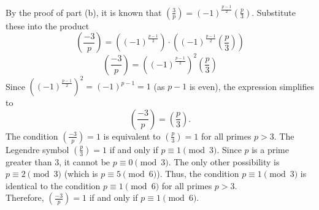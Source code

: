 \begin{enumerate}
\begin{enumerate}
\begin{subprove}
      By the proof of part (b), it is known that $\left(\frac{3}{p}\right) = (-1)^{\frac{p-1}{2}}\left(\frac{p}{3}\right)$.
      Substitute these into the product
      \[
      \left(\frac{-3}{p}\right) = \left( (-1)^{\frac{p-1}{2}} \right) \cdot \left( (-1)^{\frac{p-1}{2}}\left(\frac{p}{3}\right) \right)
      \]
      \[
      \left(\frac{-3}{p}\right) = \left( (-1)^{\frac{p-1}{2}} \right)^2 \left(\frac{p}{3}\right)
      \]
      Since $\left( (-1)^{\frac{p-1}{2}} \right)^2 = (-1)^{p-1} = 1$ (as $p-1$ is even), the expression simplifies to
      \[
      \left(\frac{-3}{p}\right) = \left(\frac{p}{3}\right).
      \]
      The condition $\left(\frac{-3}{p}\right) = 1$ is equivalent to $\left(\frac{p}{3}\right) = 1$ for all primes $p>3$.
      The Legendre symbol $\left(\frac{p}{3}\right) = 1$ if and only if $p \equiv 1 \pmod 3$.
      Since $p$ is a prime greater than $3$, it cannot be $p \equiv 0 \pmod 3$. The only other possibility is $p \equiv 2 \pmod 3$ (which is $p \equiv 5 \pmod 6$).
      Thus, the condition $p \equiv 1 \pmod 3$ is identical to the condition $p \equiv 1 \pmod 6$ for all primes $p>3$.\vspace*{10px}\\
      Therefore, $\left(\frac{-3}{p}\right) = 1$ if and only if $p \equiv 1\pmod 6$.
    \end{subprove}
  \end{enumerate}
\end{enumerate}









